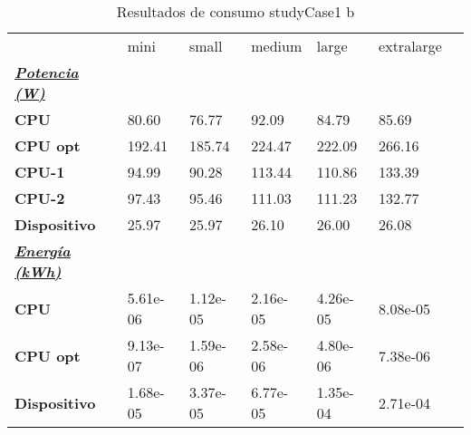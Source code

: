 \begin{table}[H]
    \centering
    \begin{tabular}{lllllll}
    \rowcolor[HTML]{DAE8FC} \ & mini & small & medium & 	large & 	extralarge \\
    \cellcolor[HTML]{DAE8FC} \textbf{\textbf{{\emph{{\underline{{Potencia (W)}}}}}}} &  &  &  & 	 & 	 \\
    \rowcolor[HTML]{EFEFEF} \cellcolor[HTML]{DAE8FC} \textbf{CPU} & 80.60 & 76.77 & 92.09 & 	84.79 & 	85.69 \\
    \cellcolor[HTML]{DAE8FC} \textbf{CPU opt} & 192.41 & 185.74 & 224.47 & 	222.09 & 	266.16 \\
    \rowcolor[HTML]{EFEFEF} \cellcolor[HTML]{DAE8FC} \textbf{\quad CPU-1} & 94.99 & 90.28 & 113.44 & 	110.86 & 	133.39 \\
    \cellcolor[HTML]{DAE8FC} \textbf{\quad CPU-2} & 97.43 & 95.46 & 111.03 & 	111.23 & 	132.77 \\
    \rowcolor[HTML]{EFEFEF} \cellcolor[HTML]{DAE8FC} \textbf{Dispositivo} & 25.97 & 25.97 & 26.10 & 	26.00 & 	26.08 \\
    \cellcolor[HTML]{DAE8FC} \textbf{\textbf{{\emph{{\underline{{Energía (kWh)}}}}}}} &  &  &  & 	 & 	 \\
    \rowcolor[HTML]{EFEFEF} \cellcolor[HTML]{DAE8FC} \textbf{CPU} & 5.61e-06 & 1.12e-05 & 2.16e-05 & 	4.26e-05 & 	8.08e-05 \\
    \cellcolor[HTML]{DAE8FC} \textbf{CPU opt} & 9.13e-07 & 1.59e-06 & 2.58e-06 & 	4.80e-06 & 	7.38e-06 \\
    \rowcolor[HTML]{EFEFEF} \cellcolor[HTML]{DAE8FC} \textbf{Dispositivo} & 1.68e-05 & 3.37e-05 & 6.77e-05 & 	1.35e-04 & 	2.71e-04 \\
    \end{tabular}
    \caption[Resultados de consumo studyCase1 b]{{Resultados de consumo studyCase1 b}}
    \label{table_test_studyCase1_b_hw_powerResults}
\end{table}